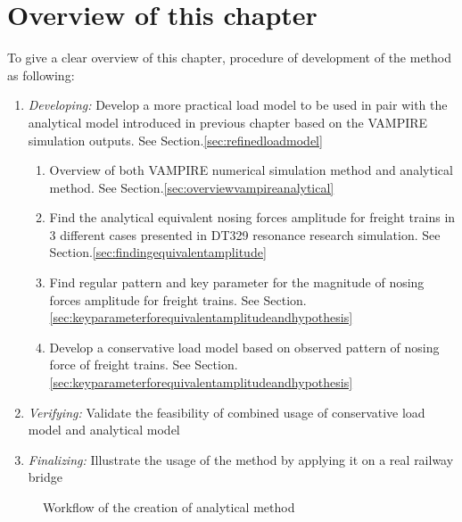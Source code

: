 \section{Overview of this chapter}

To give a clear overview of this chapter, procedure of development of the method  as following:

\begin{enumerate}
    \item \textit{Developing:} Develop a more practical load model to be used in pair with the analytical model introduced in previous chapter based on the VAMPIRE simulation outputs. See Section.\ref{sec:refinedloadmodel}
        \begin{enumerate}[label*=\arabic*.]
            \item Overview of both VAMPIRE numerical simulation method and analytical method. See Section.\ref{sec:overviewvampireanalytical}
            \item Find the analytical equivalent nosing forces amplitude for freight trains in 3 different cases presented in DT329 resonance research simulation. See Section.\ref{sec:findingequivalentamplitude}
            \item Find regular pattern and key parameter for the magnitude of nosing forces amplitude for freight trains. See Section.\ref{sec:keyparameterforequivalentamplitudeandhypothesis}
            \item Develop a conservative load model based on observed pattern of nosing force of freight trains. See Section.\ref{sec:keyparameterforequivalentamplitudeandhypothesis}
        \end{enumerate} 
    \item \textit{Verifying:} Validate the feasibility of combined usage of conservative load model and analytical model
    \item \textit{Finalizing:} Illustrate the usage of the method by applying it on a real railway bridge
\end{enumerate}

\begin{figure}[h!]
\centering
{}
\caption{Workflow of the creation of analytical method}
\label{fig:workflowanalyticalmethod}
\end{figure}

